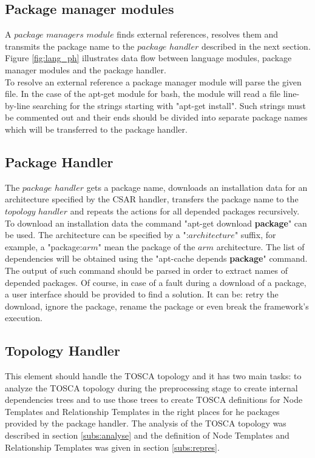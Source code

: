 \subsection{Package manager modules} \label{subs:archpmm}
A $package$ $managers$ $module$ finds external references, resolves them and transmits the package name to the $package$ $handler$ described in the next section.
Figure \ref{fig:lang_ph} illustrates data flow between language modules, package manager modules and the package handler.\\
To resolve an external reference a package manager module will parse the given file. 
In the case of the apt-get module for bash, the module will read a file line-by-line searching for the strings starting with "apt-get install".
Such strings must be commented out and their ends should be divided into separate package names which will be transferred to the package handler. 


\subsection{Package Handler} \label{subs:archph}
The $package$ $handler$ gets a package name, downloads an installation data for an architecture specified by the CSAR handler, transfers the package name to the $topology$ $handler$ and repeats the actions for all depended packages recursively. 
To download an installation data the command "apt-get download \textbf{package}" can be used. 
The architecture can be specified by a ":$architecture$" suffix, for example, a "package:$arm$" mean the package of the $arm$ architecture.
The list of dependencies will be obtained using the "apt-cache depends \textbf{package}" command. 
The output of such command should be parsed in order to extract names of depended packages.
Of course, in case of a fault during a download of a package, a user interface should be provided to find a solution.
It can be: retry the download, ignore the package, rename the package or even break the framework's execution.

\subsection{Topology Handler} \label{subs:archtop}
This element should handle the TOSCA topology and it has two main tasks: to analyze the TOSCA topology during the preprocessing stage to create internal dependencies trees and to use those trees to create TOSCA definitions for Node Templates and Relationship Templates in the right places for he packages provided by the package handler.
The analysis of the TOSCA topology was described in section \ref{subs:analyse} and the definition of Node Templates and Relationship Templates was given in section \ref{subs:repres}.

